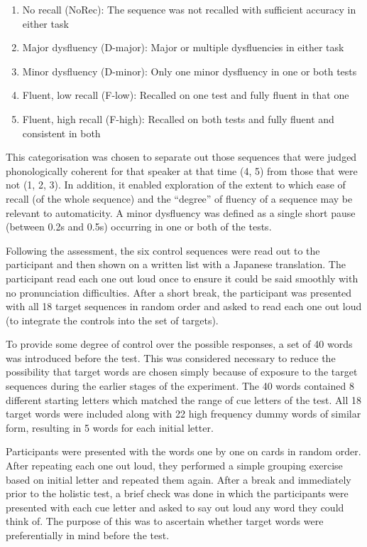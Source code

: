 \documentclass[output=paper]{langscibook}
\begin{document}
\begin{enumerate}
\item No recall (NoRec): The sequence was not recalled with sufficient accuracy in either task
\item Major dysfluency (D-major): Major or multiple dysfluencies in either task
\item Minor dysfluency (D-minor): Only one minor dysfluency in one or both tests
\item Fluent, low recall (F-low): Recalled on one test and fully fluent in that one
\item Fluent, high recall (F-high): Recalled on both tests and fully fluent and consistent in both
\end{enumerate}

This categorisation was chosen to separate out those sequences that were judged phonologically coherent for that speaker at that time (4, 5) from those that were not (1, 2, 3). In addition, it enabled exploration of the extent to which ease of recall (of the whole sequence) and the ``degree'' of fluency of a sequence may be relevant to automaticity. A minor dysfluency was defined as a single short pause (between 0.2s and 0.5s) occurring in one or both of the tests.

Following the assessment, the six control sequences were read out to the participant and then shown on a written list with a Japanese translation. The participant read each one out loud once to ensure it could be said smoothly with no pronunciation difficulties. After a short break, the participant was presented with all 18 target sequences in random order and asked to read each one out loud (to integrate the controls into the set of targets). 

To provide some degree of control over the possible responses, a set of 40 words was introduced before the test. This was considered necessary to reduce the possibility that target words are chosen simply because of exposure to the target sequences during the earlier stages of the experiment. The 40 words contained 8 different starting letters which matched the range of cue letters of the test. All 18 target words were included along with 22 high frequency dummy words of similar form, resulting in 5 words for each initial letter. 

Participants were presented with the words one by one on cards in random order. After repeating each one out loud, they performed a simple grouping exercise based on initial letter and repeated them again. After a break and immediately prior to the holistic test, a brief check was done in which the participants were presented with each cue letter and asked to say out loud any word they could think of. The purpose of this was to ascertain whether target words were preferentially in mind before the test. 
\end{document}
